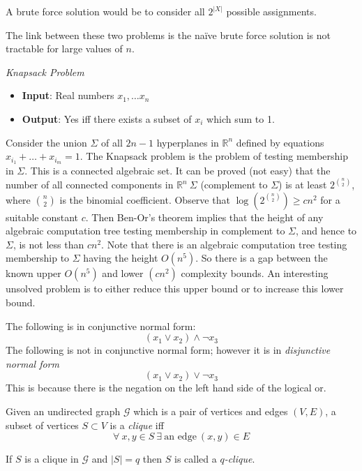 A brute force solution would be to consider all $2^{|X|}$ possible assignments.

The link between these two problems is the na\"ive brute force solution is not
tractable for large values of $n$.

\textit{Knapsack Problem}\\
\begin{itemize}
    \item \textbf{Input}: Real numbers $x_1,\dots x_n$
    \item \textbf{Output}: Yes iff there exists a subset of $x_i$ which sum to 1.
\end{itemize}
Consider the union $\Sigma$ of all $2n − 1$ hyperplanes
in $\mathbb{R}^n$ defined by equations $x_{i_1} + \dots + x_{i_m} = 1$.
The Knapsack problem is the problem of testing membership in $\Sigma$.
This is a connected algebraic set.
It can be proved (not easy) that
the number of all connected components in $\mathbb{R}^n \ \Sigma$
(complement to $\Sigma$) is at least $2^{\binom{n}{2}}$,
where $\binom{n}{2}$ is the binomial coefficient.
Observe that $\log (2^{\binom{n}{2}}) \geq cn^2$ for a suitable constant $c$.
Then Ben-Or’s theorem implies that the height of any algebraic computation tree testing membership in complement to $\Sigma$,
and hence to $\Sigma$, is not less than $cn^2$.
Note that there is an algebraic computation tree testing membership to $\Sigma$ having the height $O(n^5)$.
So there is a gap between the known upper $O(n^5)$ and lower $(cn^2)$ complexity bounds.
An interesting unsolved problem is to either reduce this upper bound or to increase this lower bound.

The following is in conjunctive normal form:
$$(x_1 \lor x_2) \land \neg x_3$$
The following is not in conjunctive normal form;
however it is in \textit{disjunctive normal form}
$$(x_1 \lor x_2) \lor \neg x_3$$
This is because there is the negation on the left hand side of the logical or.

\begin{definition}
    Given an undirected graph $\mathcal{G}$ which is a pair of vertices and edges $(V,E)$,
    a subset of vertices $S \subset V$ is a \textit{clique} iff
    $$\forall\ x, y \in S\ \exists\ \textrm{an edge}\ (x,y) \in E$$
\end{definition}

\begin{definition}
    If $S$ is a clique in $\mathcal{G}$ and $|S| = q$ then $S$ is called a \textit{$q$-clique}.
\end{definition}

